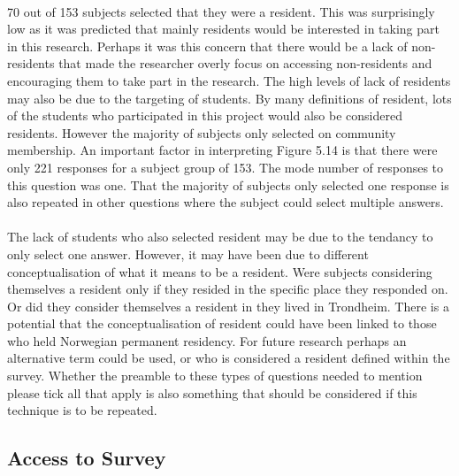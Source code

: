 \paragraph{}

\paragraph{}
70 out of 153 subjects selected that they were a resident. This was surprisingly low as it was predicted that mainly residents would be interested in taking part in this research. Perhaps it was this concern that there would be a lack of non-residents that made the researcher overly focus on accessing non-residents and encouraging them to take part in the research. The high levels of lack of residents may also be due to the targeting of students. By many definitions of resident, lots of the students who participated in this project would also be considered residents. However the majority of subjects only selected on community membership. An important factor in interpreting Figure 5.14 is that there were only 221 responses for a subject group of 153. The mode number of responses to this question was one. That the majority of subjects only selected one response is also repeated in other questions where the subject could select multiple answers. 
\paragraph{}
The lack of students who also selected resident may be due to the tendancy to only select one answer. However, it may have been due to different conceptualisation of what it means to be a resident. Were subjects considering themselves a resident only if they resided in the specific place they responded on. Or did they consider themselves a resident in they lived in Trondheim. There is a potential that the conceptualisation of resident could have been linked to those who held Norwegian permanent residency. For future research perhaps an alternative term could be used, or who is considered a resident defined within the survey. Whether the preamble to these types of questions needed to mention please tick all that apply is also something that should be considered if this technique is to be repeated. 
\paragraph{}

\subsection{Access to Survey}

